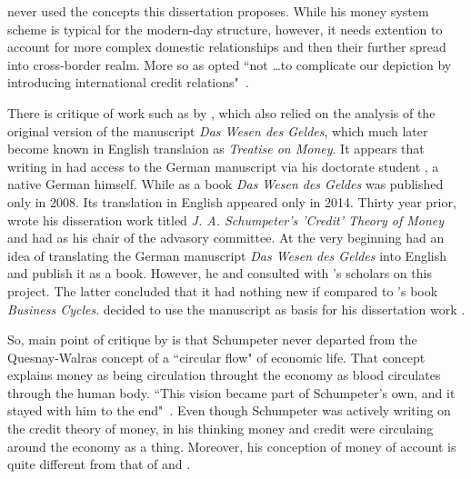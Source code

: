 \citeauthor{schumpeter2014} never used the concepts this dissertation proposes. While his money system scheme is typical for the modern-day structure, however, it needs extention to account for more complex domestic relationships and then their further spread into cross-border realm. More so as \citeauthor{schumpeter2014} opted ``not \dots to complicate our depiction by introducing international credit relations"~\citep[p.~184]{schumpeter2014}.

There is critique of \citeauthor{schumpeter2014} work such as by \cite{earley1994}, which also relied on the analysis of the original version of the manuscript \textit{Das Wesen des Geldes}, which much later become known in English translaion as \textit{Treatise on Money}. It appears that \citeauthor{earley1994} writing in \citeyear{earley1994} had access to the German manuscript via his doctorate student \citeauthor{reclam1984}, a native German himself. While as a book \textit{Das Wesen des Geldes} was published only in 2008. Its translation in English appeared only in 2014. Thirty year prior, \citeauthor{reclam1984} wrote his disseration work titled \textit{J. A. Schumpeter's 'Credit' Theory of Money} and had \citeauthor{earley1994} as his chair of the advasory committee. At the very beginning \citeauthor{reclam1984} had an idea of translating the German manuscript \textit{Das Wesen des Geldes} into English and publish it as a book. However, he and \citeauthor{earley1994} consulted with \citeauthor{schumpeter2014}'s scholars on this project. The latter concluded that it had nothing new if compared to \citeauthor{schumpeter1939_1}'s book \textit{Business Cycles}. \citeauthor{reclam1984} decided to use the manuscript as basis for his dissertation work \citep{reclam1984}.

So, main point of critique by \cite{earley1994} is that Schumpeter never departed from the Quesnay-Walras concept of a ``circular flow" of economic life. That concept explains money as being circulation throught the economy as blood circulates through the human body. ``This vision became part of Schumpeter's own, and it stayed with him to the end"~\cite[p.~344]{earley1994}. Even though Schumpeter was actively writing on the credit theory of money, in his thinking money and credit were circulaing around the economy as a thing. Moreover, his conception of money of account is quite different from that of \citeauthor{keynes1930a} and \citeauthor{innes1913}.

